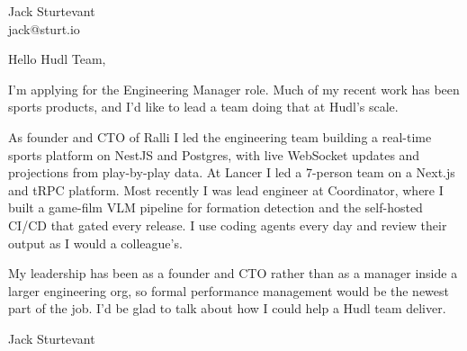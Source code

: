 \documentclass[11pt]{article}
\begin{document}
\raggedright

{\namefont\fontsize{20pt}{24pt}\selectfont Jack Sturtevant}\\[-0.3em]
jack@sturt.io

\vspace{1.2em}

Hello Hudl Team,

I'm applying for the Engineering Manager role. Much of my recent work has been sports products, and I'd like to lead a team doing that at Hudl's scale.

As founder and CTO of Ralli I led the engineering team building a real-time sports platform on NestJS and Postgres, with live WebSocket updates and projections from play-by-play data. At Lancer I led a 7-person team on a Next.js and tRPC platform. Most recently I was lead engineer at Coordinator, where I built a game-film VLM pipeline for formation detection and the self-hosted CI/CD that gated every release. I use coding agents every day and review their output as I would a colleague's.

My leadership has been as a founder and CTO rather than as a manager inside a larger engineering org, so formal performance management would be the newest part of the job. I'd be glad to talk about how I could help a Hudl team deliver.

\vspace{0.6em}
Jack Sturtevant
\end{document}

